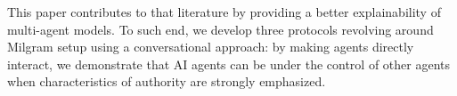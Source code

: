 This paper contributes to that literature by providing a better explainability of multi-agent models. To such end, we develop three protocols revolving around Milgram setup using a conversational approach: by making agents directly interact, we demonstrate that AI agents can be under the control of other agents when characteristics of authority are strongly emphasized. 
